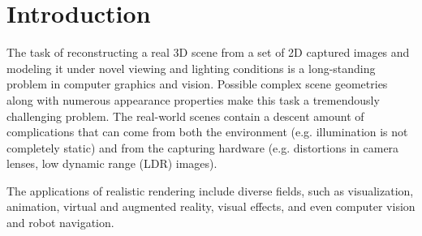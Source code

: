 \chapter{Introduction}
\label{chap:introduction}





The task of reconstructing a real 3D scene from a set of 2D captured images
and modeling it under novel viewing and lighting conditions
is a long-standing problem in computer graphics and vision.
Possible complex scene geometries along with numerous appearance properties
make this task a tremendously challenging problem.
The real-world scenes contain a descent amount of complications
that can come from both the environment (e.g. illumination is not completely static)
and from the capturing hardware (e.g. distortions in camera lenses, low dynamic range (LDR) images).

The applications of realistic rendering include diverse fields,
such as visualization, animation, virtual and augmented reality, visual effects,
and even computer vision and robot navigation.



